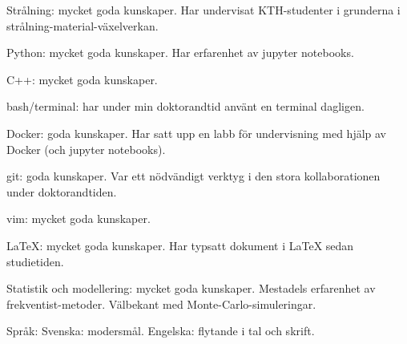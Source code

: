 



\begin{cvskills}

\cvskill
{Strålning:}
{mycket goda kunskaper. Har undervisat KTH-studenter i grunderna i strålning-material-växelverkan.}

\cvskill
{Python:}
{mycket goda kunskaper. Har erfarenhet av jupyter notebooks.}

\cvskill
{C++:}
{mycket goda kunskaper.}

\cvskill
{bash/terminal:}
{har under min doktorandtid anv{\"a}nt en terminal dagligen.}

\cvskill
{Docker:} 
{goda kunskaper. Har satt upp en labb f{\"o}r undervisning med hj{\"a}lp av Docker (och jupyter notebooks).}

\cvskill
{git:}
{goda kunskaper. Var ett n{\"o}dv{\"a}ndigt verktyg i den stora kollaborationen under doktorandtiden.}

\cvskill
{vim:}
{mycket goda kunskaper.}

\cvskill
{LaTeX:}
{mycket goda kunskaper. Har typsatt dokument i LaTeX sedan studietiden.}

\cvskill
{Statistik och} {}
\cvskill
{modellering:}
{mycket goda kunskaper. Mestadels erfarenhet av frekventist-metoder. V{\"a}lbekant med Monte-Carlo-simuleringar.}

\cvskill
{Spr{\aa}k:}
{Svenska: modersm{\aa}l. Engelska: flytande i tal och skrift.}


\end{cvskills}